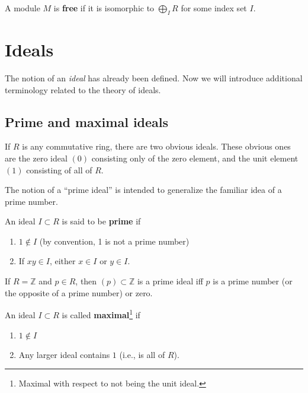 \begin{definition} A module $M$ is \textbf{free} if it is isomorphic to
$\bigoplus_I R$ for some index set $I$. \end{definition}

\section{Ideals}

The notion of an \emph{ideal} has already been defined. Now we will introduce
additional terminology related to the theory of ideals.

\subsection{Prime and maximal ideals}

If $R$ is any commutative ring, there are two obvious ideals. These obvious
ones are the zero ideal $(0)$ consisting only of the zero element, and the unit
element $(1)$ consisting of all of $R$.

The notion of a ``prime ideal'' is intended to generalize the familiar idea of
a prime number.

\begin{definition} An ideal $I \subset R$ is said to be \textbf{prime} if
\begin{enumerate}[\textbf{P} 1] \item $1 \notin I$ (by convention, 1 is not a
prime number) \item If $xy \in I$, either $x \in I$ or $y \in I$.
\end{enumerate} \end{definition}

\begin{example} \label{integerprimes} If $R = \mathbb{Z}$ and $p \in R$, then
$(p) \subset \mathbb{Z}$ is a prime ideal iff $p$ is a prime number (or the
opposite of a prime number) or zero. \end{example}

\begin{definition} An ideal $I \subset R$ is called
\textbf{maximal}\footnote{Maximal with respect to not being the unit ideal.} if
\begin{enumerate}[\textbf{M} 1] \item $1 \notin I$ \item Any larger ideal
contains $1$ (i.e., is all of $R$). \end{enumerate} \end{definition}


